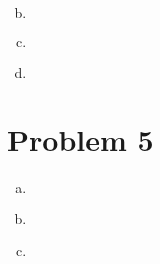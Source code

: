 \documentclass{article}
\begin{document}
\begin{flushleft}
\begin{enumerate}[(a)]
\begin{multline*}
\end{multline*}



	\item 

\begin{multline*}

\end{multline*}



	\item 

\begin{multline*}\\

\end{multline*}



	\item 

\begin{multline*}\\

\end{multline*}



\end{enumerate}



	\section*{Problem 5}

\begin{enumerate}[(a)]

	

	\item 

\begin{multline*}\\

\end{multline*}



	\item 

\begin{multline*}\\

\end{multline*}



	\item 

\begin{multline*}\\


\end{multline*}
\end{enumerate}
\end{flushleft}
\end{document}
